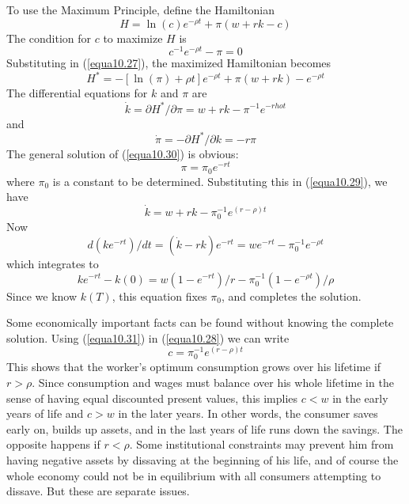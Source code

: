 To use the Maximum Principle, define the Hamiltonian
\begin{equation} \label{equa10.27}
  H = \ln(c) e^{-\rho t} + \pi (w+rk-c)
\end{equation}
The condition for $c$ to maximize $H$ is
\begin{equation} \label{equa10.28}
  c^{-1} e^{-\rho t} - \pi =0
\end{equation}
Substituting in (\ref{equa10.27}), the maximized Hamiltonian becomes
\begin{equation*}
 H^* = -[\ln(\pi) +\rho t   ] e^{-\rho t} + \pi(w+rk) - e^{-\rho t}
\end{equation*}
The differential equations for $k$ and $\pi$ are
\begin{equation} \label{equa10.29}
\dot{k} = \partial H^* / \partial \pi = w + rk - \pi^{-1} e^{-rho t}
\end{equation}
and 
\begin{equation} \label{equa10.30}
\dot{\pi} = -\partial H^* / \partial k = -r \pi
\end{equation}
The general solution of (\ref{equa10.30}) is obvious:
\begin{equation} \label{equa10.31}
\pi = \pi_0 e^{-rt}
\end{equation}
where $\pi_0$ is a constant to be determined. Substituting this in (\ref{equa10.29}), we have
\begin{equation*}
 \dot{k} = w + rk - \pi_0^{-1} e^{(r-\rho)t}
\end{equation*}
Now
\begin{equation*}
d(k e^{-rt}) / dt = (\dot{k} -rk) e^{-rt} = w e^{-rt} - \pi_0^{-1} e^{-\rho t}
\end{equation*}
which integrates to
\begin{equation*}
k e^{-rt} - k(0) = w(1-e^{-rt})/r  - \pi_0^{-1} (1-e^{-\rho t})/ \rho
\end{equation*}
Since we know $k(T)$, this equation fixes $\pi_0$, and completes the solution.

Some economically important facts can be found without knowing the complete solution. Using (\ref{equa10.31}) in (\ref{equa10.28}) we can write
\begin{equation*}
c = \pi_0^{-1} e^{(r-\rho)t}
\end{equation*}
This shows that the worker's optimum consumption grows over his lifetime if $r>\rho$. Since consumption and wages must balance over his whole lifetime in the sense of having equal discounted present values, this implies $c < w$ in the early years of life and $c > w$ in the later years. In other words, the consumer saves early on, builds up assets, and in the last years of life runs down the savings. The opposite happens if $r < \rho$. Some institutional constraints may prevent him from having negative assets by dissaving at the beginning of his life, and of course the whole economy could not be in equilibrium with all consumers attempting to dissave. But these are separate issues.

